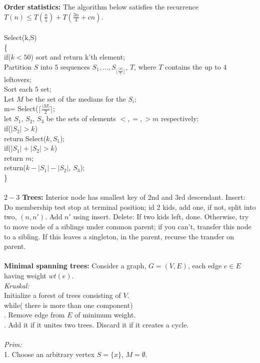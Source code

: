 {\bf Order statistics:} The algorithm below satisfies the recurrence 
$T(n) \leq T({\frac n 5}) + T({\frac {3n} 4} + cn)$.
\\
\\
Select(k,S) \\
\{\\
\jt if($k<50$)
\jt \jt sort and return k'th element;\\
\jt Partition $S$ into $5$ sequences $S_1, \ldots , S_{\lfloor {\frac{|S|} 5} \rfloor}$, $T$,
where $T$ contains the up to $4$ leftovers;\\
\jt Sort each $5$ set;\\
\jt Let $M$ be the set of the medians for the $S_i$;\\
\jt m= Select($\lceil {\frac {|M|} 2} \rceil$;\\
\jt let $S_1$, $S_2$, $S_3$ be the sets of elements $<, =, > m$ respectively;\\
\jt if($|S_2|>k$)\\
\jt \jt return Select($k, S_1$);\\
\jt if($|S_1|+|S_2|>k$) \\
\jt \jt return $m$;\\
\jt return($k-|S_1|-|S_2|$, $S_3$);\\
\}
\\
\\
{\bf $2-3$ Trees:} Interior node has smallest key of 2nd and 3rd descendant.
Insert: Do membership test stop at terminal position; id 2 kids, add one, if
not, split into two, $(n, n')$.  Add $n'$ using insert.  
Delete: If two kids left, done.
Otherwise, try to move node of a siblings under common parent; if you can't,
transfer this node to a sibling.  If this leaves a singleton, in the parent,
recurse the transfer on parent.
\\
\\
{\bf Minimal spanning trees:}  Consider a graph,
$G= (V,E)$, each edge $e \in E$ having weight $wt(e)$.  
\\
\emph{Kruskal:}
\\
 Initialize a forest of trees consisting of $V$.\\
while( there is more than one component) \\
. Remove edge from $E$ of minimum weight.\\
. Add it if it unites two trees.  Discard it if it creates a cycle.\\
\\
\emph{Prim:}\\
1. Choose an arbitrary vertex $S= \{x\}$, $M=\emptyset$.\\
